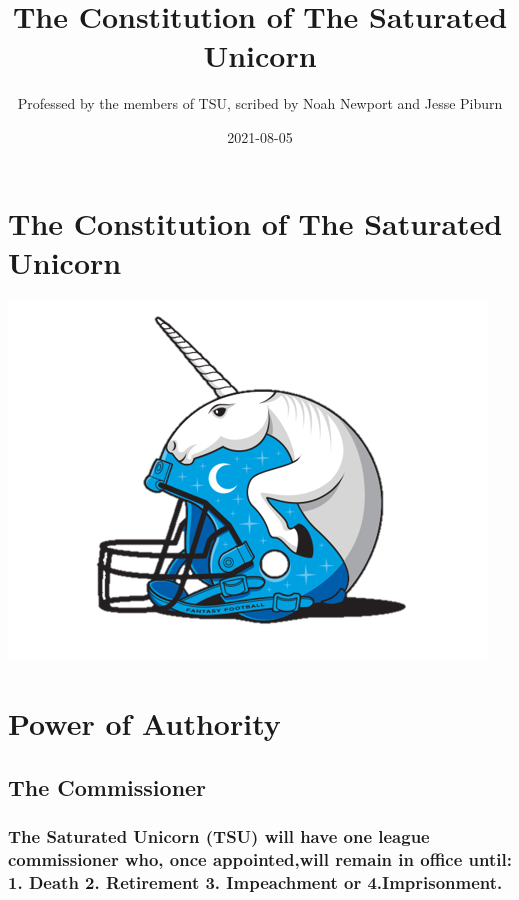 \documentclass[
]{book}
\title{The Constitution of The Saturated Unicorn}
\author{Professed by the members of TSU, scribed by Noah Newport and Jesse Piburn}
\date{2021-08-05}
\begin{document}
\maketitle

{
\setcounter{tocdepth}{1}
\tableofcontents
}
\hypertarget{the-constitution-of-the-saturated-unicorn}{%
\chapter*{The Constitution of The Saturated Unicorn}\label{the-constitution-of-the-saturated-unicorn}}

\includegraphics[width=0.9\linewidth]{images/tsu-logo}

\hypertarget{power-of-authority}{%
\chapter{Power of Authority}\label{power-of-authority}}

\hypertarget{the-commissioner}{%
\section{The Commissioner}\label{the-commissioner}}

\hypertarget{the-saturated-unicorn-tsu-will-have-one-league-commissioner-who-once-appointedwill-remain-in-office-until-1.-death-2.-retirement-3.-impeachment-or-4.imprisonment.}{%
\subsection{The Saturated Unicorn (TSU) will have one league commissioner who, once appointed,will remain in office until: 1. Death 2. Retirement 3. Impeachment or 4.Imprisonment.}\label{the-saturated-unicorn-tsu-will-have-one-league-commissioner-who-once-appointedwill-remain-in-office-until-1.-death-2.-retirement-3.-impeachment-or-4.imprisonment.}}
\end{document}
